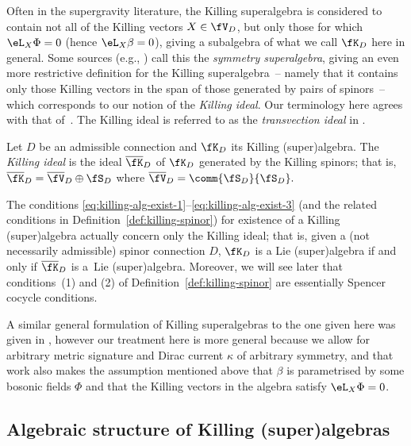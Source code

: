 Often in the supergravity literature, the Killing superalgebra is considered to contain not all of the Killing vectors $X\in\fV_D$, but only those for which $\eL_X\Phi=0$ (hence $\eL_X\beta=0$), giving a subalgebra of what we call $\fK_D$ here in general. Some sources (e.g., \cite{Figueroa-OFarrill2009,Hustler2016}) call this the \emph{symmetry superalgebra}, giving an even more restrictive definition for the Killing superalgebra~-- namely that it contains only those Killing vectors in the span of those generated by pairs of spinors~-- which corresponds to our notion of the \emph{Killing ideal}. Our terminology here agrees with that of~\cite{Figueroa-OFarrill2017_1}. The Killing ideal is referred to as the \emph{transvection ideal} in \cite{Santi2022}.

\begin{Definition}
	Let $D$ be an admissible connection and $\fK_D$ its Killing (super)algebra. The \emph{Killing ideal} is the ideal $\overline\fK_D$ of $\fK_D$ generated by the Killing spinors; that is, $\overline\fK_D=\overline\fV_D\oplus\fS_D$ where $\overline\fV_D = \comm{\fS_D}{\fS_D}.$
\end{Definition}

\begin{Remark}
	The conditions \eqref{eq:killing-alg-exist-1}--\eqref{eq:killing-alg-exist-3} (and the related conditions in Definition~\ref{def:killing-spinor}) for existence of a Killing (super)algebra actually concern only the Killing ideal; that is, given a (not necessarily admissible) spinor connection $D$, $\fK_D$ is a Lie (super)algebra if and only if $\overline\fK_D$ is a~Lie (super)algebra. Moreover, we will see later that conditions~(1) and (2) of Definition~\ref{def:killing-spinor} are essentially Spencer cocycle conditions.
\end{Remark}

A similar general formulation of Killing superalgebras to the one given here was given in \cite{Hustler2016}, however our treatment here is more general because we allow for arbitrary metric signature and Dirac current $\kappa$ of arbitrary symmetry, and that work also makes the assumption mentioned above that $\beta$ is parametrised by some bosonic fields $\Phi$ and that the Killing vectors in the algebra satisfy $\eL_X\Phi=0$.

\subsection{Algebraic structure of Killing (super)algebras}
\label{sec:alg-structure-killing}


